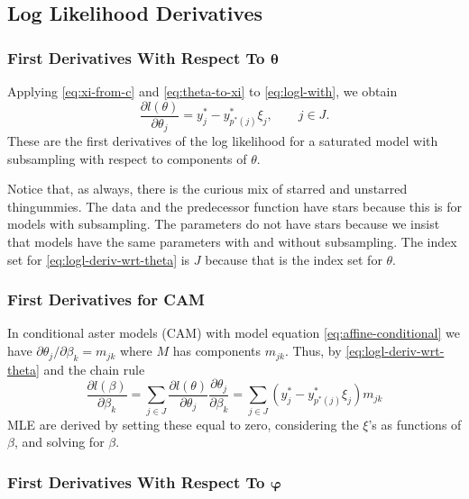 \subsection{Log Likelihood Derivatives}
\label{sec:log-likelihood-derivatives}

\subsubsection{First Derivatives With Respect To $\boldsymbol{\theta}$}
\label{sec:wrt-theta}

Applying \eqref{eq:xi-from-c} and \eqref{eq:theta-to-xi}
to \eqref{eq:logl-with}, we obtain
\begin{equation} \label{eq:logl-deriv-wrt-theta}
   \frac{\partial l(\theta)}{\partial \theta_j}
   =
   y^*_j - y^*_{p^*(j)} \xi_j,
   \qquad j \in J.
\end{equation}
These are the first derivatives of the log likelihood for a saturated model
with subsampling with respect to components of $\theta$.

Notice that, as always, there is the curious mix of starred and unstarred
thingummies.  The data and the predecessor function have stars because this
is for models with subsampling.  The parameters do not have stars because
we insist that models have the same parameters with and without subsampling.
The index set for \eqref{eq:logl-deriv-wrt-theta} is $J$ because that is
the index set for $\theta$.

\subsubsection{First Derivatives for CAM}
\label{sec:logl-cam-deriv}

In conditional aster models (CAM) with model equation
\eqref{eq:affine-conditional}
we have $\partial \theta_j / \partial \beta_k = m_{j k}$
where $M$ has components $m_{j k}$.
Thus, by \eqref{eq:logl-deriv-wrt-theta} and the chain rule
$$
   \frac{\partial l(\beta)}{\partial \beta_k}
   =
   \sum_{j \in J}
   \frac{\partial l(\theta)}{\partial \theta_j}
   \frac{\partial \theta_j}{\partial \beta_k}
   =
   \sum_{j \in J} ( y^*_j - y^*_{p^*(j)} \xi_j ) m_{j k}
$$
MLE are derived by setting these equal to zero, considering the $\xi$'s
as functions of $\beta$, and solving for $\beta$.

\subsubsection{First Derivatives With Respect To $\boldsymbol{\varphi}$}
\label{sec:wrt-phi}

